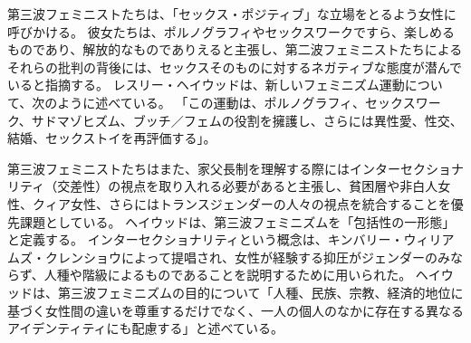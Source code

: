 \documentclass[paper=a4,book,openany]{jlreq}
\begin{document}
第三波フェミニストたちは、「セックス・ポジティブ」な立場をとるよう女性に呼びかける。
彼女たちは、ポルノグラフィやセックスワークですら、楽しめるものであり、解放的なものでありえると主張し、第二波フェミニストたちによるそれらの批判の背後には、セックスそのものに対するネガティブな態度が潜んでいると指摘する。
レスリー・ヘイウッドは、新しいフェミニズム運動について、次のように述べている。
「この運動は、ポルノグラフィ、セックスワーク、サドマゾヒズム、ブッチ／フェムの役割を擁護し、さらには異性愛、性交、結婚、セックストイを再評価する」\citep[vol.1, p.260]{heywood06:_women_movem_today}。

第三波フェミニストたちはまた、家父長制を理解する際にはインターセクショナリティ（交差性）の視点を取り入れる必要があると主張し、貧困層や非白人女性、クィア女性、さらにはトランスジェンダーの人々の視点を統合することを優先課題としている。
ヘイウッドは、第三波フェミニズムを「包括性の一形態」と定義する\citep[vol.1, p.xx]{heywood06:_women_movem_today}。
インターセクショナリティという概念は、キンバリー・ウィリアムズ・クレンショウによって提唱され、女性が経験する抑圧がジェンダーのみならず、人種や階級によるものであることを説明するために用いられた\citep{crenshaw89:_demar_inter_race_sex}。
ヘイウッドは、第三波フェミニズムの目的について「人種、民族、宗教、経済的地位に基づく女性間の違いを尊重するだけでなく、一人の個人のなかに存在する異なるアイデンティティにも配慮する」と述べている\citep[vol. 1, p.xx]{heywood06:_women_movem_today}。
\end{document}
